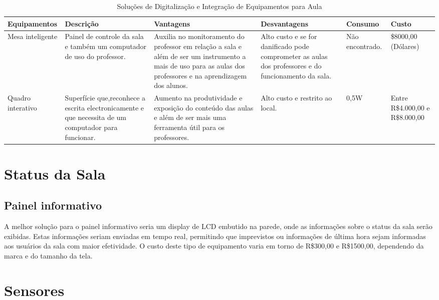 \begin{table}[!h]
  \centering
  \caption{Soluções de Digitalização e Integração de Equipamentos para Aula}
  \label{my-label}
  \begin{tabular}{|l|l|l|l|l|l|}
    \hline
    \textbf{Equipamentos} & \textbf{Descrição} & \textbf{Vantagens} & \textbf{Desvantagens} & \textbf{Consumo} & \textbf{Custo} \\ \hline
    \parbox[t]{3cm}{Mesa inteligente} & \parbox[t]{2cm}{Painel de controle da sala e também um computador de uso do professor}. & \parbox[t]{3cm}{Auxilia no monitoramento do professor em relação a sala e além de ser um instrumento a mais de uso para as aulas dos professores e na aprendizagem dos alunos.} & \parbox[t]{3cm}{Alto custo e se for danificado pode comprometer as aulas dos professores e do funcionamento da sala.} & \parbox[t]{2cm}{Não encontrado.} & \parbox[t]{2cm}{\$8000,00 (Dólares)} \\ \hline
    \parbox[t]{3cm}{Quadro interativo} & \parbox[t]{2cm}{Superfície que,reconhece a escrita electronicamente e que necessita de um computador para funcionar.} & \parbox[t]{3cm}{Aumento na produtividade e exposição do conteúdo das aulas e além de ser mais uma ferramenta útil para os professores.} & \parbox[t]{3cm}{Alto custo e restrito ao local.} & \parbox[t]{2cm}{0,5W} & \parbox[t]{2cm}{Entre R\$4.000,00 e R\$8.000,00} \\ \hline
  \end{tabular}
\end{table}

\section{Status da Sala}

\subsection{Painel informativo}

A melhor solução para o painel informativo seria um display de LCD embutido na parede, onde as informações sobre o status da sala serão exibidas. Estas informações seriam enviadas em tempo real, permitindo que imprevistos ou informações de última hora sejam informadas aos usuários da sala com maior efetividade. O custo deste tipo de equipamento varia em torno de R\$300,00 e R\$1500,00, dependendo da marca e do tamanho da tela.

\section{Sensores}


